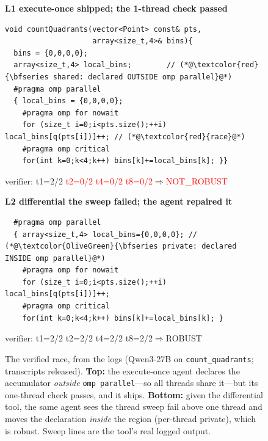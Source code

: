 \begin{figure}[t]
\textbf{\footnotesize L1 execute-once \textemdash{} shipped; the 1-thread check passed}
\begin{lstlisting}
void countQuadrants(vector<Point> const& pts,
                    array<size_t,4>& bins){
  bins = {0,0,0,0};
  array<size_t,4> local_bins;        // (*@\textcolor{red}{\bfseries shared: declared OUTSIDE omp parallel}@*)
  #pragma omp parallel
  { local_bins = {0,0,0,0};
    #pragma omp for nowait
    for (size_t i=0;i<pts.size();++i) local_bins[q(pts[i])]++; // (*@\textcolor{red}{race}@*)
    #pragma omp critical
    for(int k=0;k<4;k++) bins[k]+=local_bins[k]; }}
\end{lstlisting}
\vspace{-1pt}
{\scriptsize\ttfamily verifier: t1=2/2\; \textcolor{red}{t2=0/2\; t4=0/2\; t8=0/2}\;\(\Rightarrow\)\;\textcolor{red}{NOT\_ROBUST}}

\vspace{4pt}
\textbf{\footnotesize L2 differential \textemdash{} the sweep failed; the agent repaired it}
\begin{lstlisting}
  #pragma omp parallel
  { array<size_t,4> local_bins={0,0,0,0}; // (*@\textcolor{OliveGreen}{\bfseries private: declared INSIDE omp parallel}@*)
    #pragma omp for nowait
    for (size_t i=0;i<pts.size();++i) local_bins[q(pts[i])]++;
    #pragma omp critical
    for(int k=0;k<4;k++) bins[k]+=local_bins[k]; }
\end{lstlisting}
\vspace{-1pt}
{\scriptsize\ttfamily verifier: \textcolor{OliveGreen}{t1=2/2\; t2=2/2\; t4=2/2\; t8=2/2}\;\(\Rightarrow\)\;\textcolor{OliveGreen}{ROBUST}}
\caption{The verified race, from the logs (Qwen3-27B on \texttt{count\_quadrants};
transcripts released). \textbf{Top:} the execute-once agent declares the
accumulator \emph{outside} \texttt{omp parallel}---so all threads share it---but
its one-thread check passes, and it ships. \textbf{Bottom:} given the differential
tool, the same agent sees the thread sweep fail above one thread and moves the
declaration \emph{inside} the region (per-thread private), which is robust. Sweep
lines are the tool's real logged output.}
\label{fig:casestudy}
\end{figure}

